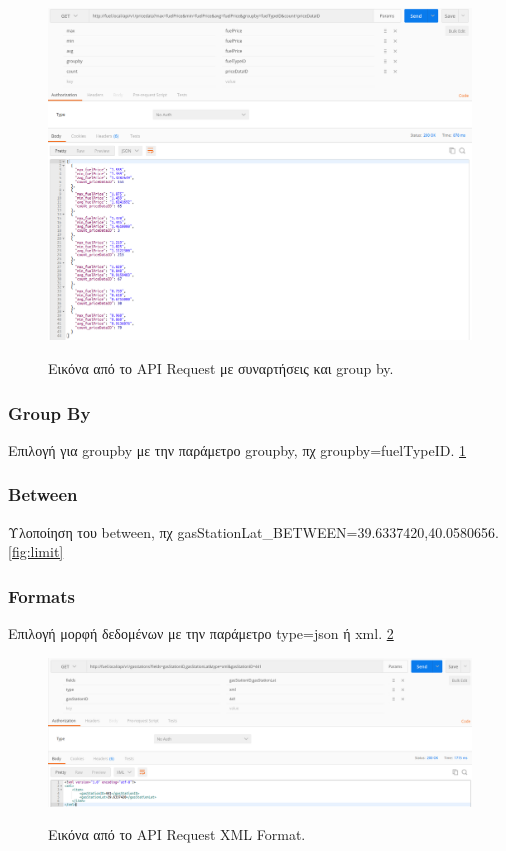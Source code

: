\begin{figure}[H]
  \caption{Εικόνα από το API Request με συναρτήσεις και group by.}
  \centering
    \includegraphics[width=1\textwidth]{img/aggregate.png}
    \label{fig:aggregate}
\end{figure}

\subsubsection{Group By}
Επιλογή για groupby με την παράμετρο groupby, πχ groupby=fuelTypeID. \ref{fig:aggregate}

\subsubsection{Between}
Υλοποίηση του between, πχ gasStationLat\_BETWEEN=39.6337420,40.0580656. \ref{fig:limit}

\subsubsection{Formats}
Επιλογή μορφή δεδομένων με την παράμετρο type=json ή xml. \ref{fig:format}

\begin{figure}[H]
  \caption{Εικόνα από το API Request XML Format.}
  \centering
    \includegraphics[width=1\textwidth]{img/format.png}
    \label{fig:format}
\end{figure}

